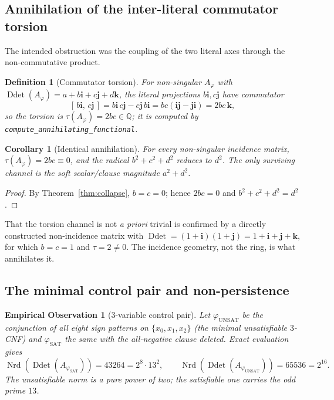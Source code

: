 \documentclass[pdflatex,sn-mathphys-num]{sn-jnl}
\theoremstyle{thmstyleone}%
\newtheorem{corollary}[theorem]{Corollary}%
\theoremstyle{thmstyletwo}%
\newtheorem{observation}[theorem]{Empirical Observation}%
\theoremstyle{thmstylethree}%
\newtheorem{definition}{Definition}%
\newcommand{\QQ}{\mathbb{Q}}
\newcommand{\Nrd}{\operatorname{Nrd}}
\newcommand{\Ddet}{\operatorname{Ddet}}
\newcommand{\bi}{\mathbf{i}}
\newcommand{\bj}{\mathbf{j}}
\newcommand{\bk}{\mathbf{k}}
\newcommand{\Aphi}{A_{\varphi}}
\begin{document}
\subsection{Annihilation of the inter-literal commutator torsion}

The intended obstruction was the coupling of the two literal axes through
the non-commutative product.

\begin{definition}[Commutator torsion]\label{def:torsion}
For non-singular $\Aphi$ with $\Ddet(\Aphi)=a+b\bi+c\bj+d\bk$, the literal
projections $b\bi,c\bj$ have commutator
\[
  [\,b\bi,\,c\bj\,]=b\bi\,c\bj-c\bj\,b\bi=bc(\bi\bj-\bj\bi)=2bc\,\bk,
\]
so the torsion is $\tau(\Aphi)=2bc\in\QQ$; it is computed by
\texttt{compute\_annihilating\_functional}.
\end{definition}

\begin{corollary}[Identical annihilation]\label{cor:torsion}
For every non-singular incidence matrix, $\tau(\Aphi)=2bc\equiv0$, and the
radical $b^2+c^2+d^2$ reduces to $d^2$. The only surviving channel is the
soft scalar/clause magnitude $a^2+d^2$.
\end{corollary}

\begin{proof}
By Theorem~\ref{thm:collapse}, $b=c=0$; hence $2bc=0$ and
$b^2+c^2+d^2=d^2$.
\end{proof}

That the torsion channel is not \emph{a priori} trivial is confirmed by a
directly constructed non-incidence matrix with
$\Ddet=(1+\bi)(1+\bj)=1+\bi+\bj+\bk$, for which $b=c=1$ and $\tau=2\neq0$.
The incidence geometry, not the ring, is what annihilates it.

\subsection{The minimal control pair and non-persistence}

\begin{observation}[$3$-variable control pair]\label{obs:linpair}
Let $\varphi_{\mathrm{UNSAT}}$ be the conjunction of all eight sign patterns
on $\{x_0,x_1,x_2\}$ (the minimal unsatisfiable $3$-CNF) and
$\varphi_{\mathrm{SAT}}$ the same with the all-negative clause deleted.
Exact evaluation gives
\[
  \Nrd(\Ddet(A_{\varphi_{\mathrm{SAT}}}))=43264=2^{8}\cdot13^{2},
  \qquad
  \Nrd(\Ddet(A_{\varphi_{\mathrm{UNSAT}}}))=65536=2^{16}.
\]
The unsatisfiable norm is a pure power of two; the satisfiable one carries
the odd prime $13$.
\end{observation}
\end{document}
